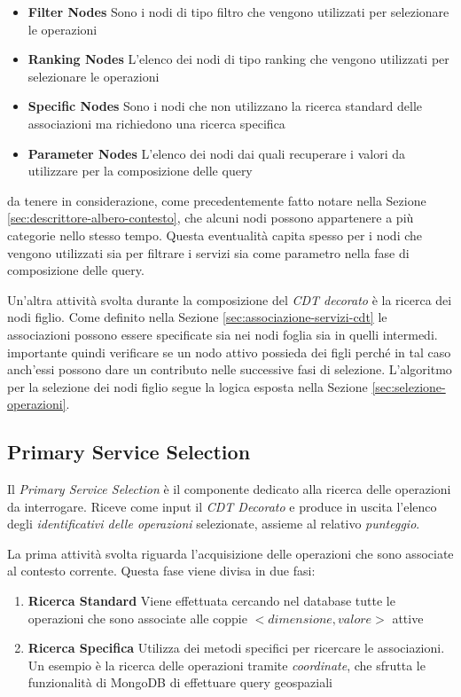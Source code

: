\begin{itemize}
	\item \textbf{Filter Nodes}
	Sono i nodi di tipo filtro che vengono utilizzati per selezionare le operazioni
	\item \textbf{Ranking Nodes}
	L'elenco dei nodi di tipo ranking che vengono utilizzati per selezionare le operazioni
	\item \textbf{Specific Nodes}
	Sono i nodi che non utilizzano la ricerca standard delle associazioni ma richiedono una ricerca specifica
	\item \textbf{Parameter Nodes}
	L'elenco dei nodi dai quali recuperare i valori da utilizzare per la composizione delle query
\end{itemize}

\upe da tenere in considerazione, come precedentemente fatto notare nella Sezione \ref{sec:descrittore-albero-contesto}, che alcuni nodi possono appartenere a più categorie nello stesso tempo. Questa eventualità capita spesso per i nodi che vengono utilizzati sia per filtrare i servizi sia come parametro nella fase di composizione delle query.

Un'altra attività svolta durante la composizione del \emph{CDT decorato} è la ricerca dei nodi figlio. Come definito nella Sezione \ref{sec:associazione-servizi-cdt} le associazioni possono essere specificate sia nei nodi foglia sia in quelli intermedi. \upe importante quindi verificare se un nodo attivo possieda dei figli perché in tal caso anch'essi possono dare un contributo nelle successive fasi di selezione. L'algoritmo per la selezione dei nodi figlio segue la logica esposta nella Sezione \ref{sec:selezione-operazioni}.

\subsection{Primary Service Selection\label{sec:primary-service-selection}}

Il \emph{Primary Service Selection} è il componente dedicato alla ricerca delle operazioni da interrogare. Riceve come input il \emph{CDT Decorato} e produce in uscita l'elenco degli \emph{identificativi delle operazioni} selezionate, assieme al relativo \emph{punteggio}.

La prima attività svolta riguarda l'acquisizione delle operazioni che sono associate al contesto corrente. Questa fase viene divisa in due fasi:

\begin{enumerate}
	\item \textbf{Ricerca Standard}
	Viene effettuata cercando nel database tutte le operazioni che sono associate alle coppie $ {<}dimensione, valore{>} $ attive
	\item \textbf{Ricerca Specifica}
	Utilizza dei metodi specifici per ricercare le associazioni. Un esempio è la ricerca delle operazioni tramite \emph{coordinate}, che sfrutta le funzionalità di MongoDB di effettuare query geospaziali
\end{enumerate}

